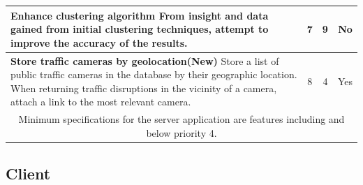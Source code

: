 \begin{center}
\begin{tabular}{ | p{8.5cm} | c | c | c | }
\textbf{Enhance clustering algorithm} \newline
From insight and data gained from initial clustering techniques, attempt to
improve the accuracy of the results.& 7 & 9 & No \\ \hline

\textbf{Store traffic cameras by geolocation(New)}\newline
Store a list of public traffic cameras in the database by their geographic
location. When returning traffic disruptions in the vicinity of a camera,
attach a link to the most relevant camera. &  8 &  4 & Yes \\ \hline

\multicolumn{4}{|c|}{Minimum specifications for the server application are
features including and below priority 4.} \\ \hline
\end{tabular}
\end{center}

\subsection{Client}

